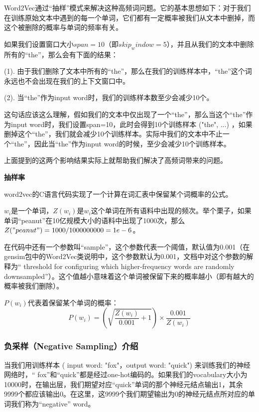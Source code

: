 \documentclass[12pt]{article}
\begin{document}
Word2Vec通过“抽样”模式来解决这种高频词问题。它的基本思想如下：对于我们在训练原始文本中遇到的每一个单词，它们都有一定概率被我们从文本中删掉，而这个被删除的概率与单词的频率有关。

如果我们设置窗口大小$span = 10$（即$skip_window = 5$），并且从我们的文本中删除所有的“the”，那么会有下面的结果：

(1). 由于我们删除了文本中所有的“the”，那么在我们的训练样本中，“the”这个词永远也不会出现在我们的上下文窗口中。

(2). 当“the”作为input word时，我们的训练样本数至少会减少10个。

\begin{framed}
这句话应该这么理解，假如我们的文本中仅出现了一个“the”，那么当这个“the”作为input word时，我们设置span=10，此时会得到10个训练样本 ("the", ...) ，如果删掉这个“the”，我们就会减少10个训练样本。实际中我们的文本中不止一个“the”，因此当“the”作为input word的时候，至少会减少10个训练样本。
\end{framed}

上面提到的这两个影响结果实际上就帮助我们解决了高频词带来的问题。

\textbf{抽样率}

word2vec的C语言代码实现了一个计算在词汇表中保留某个词概率的公式。

$w_i$是一个单词，$Z(w_i)$是$w_i$这个单词在所有语料中出现的频次。举个栗子，如果单词“peanut”在10亿规模大小的语料中出现了1000次，那么$Z("peanut") = 1000 / 1000000000 = 1e-6$。

在代码中还有一个参数叫“sample”，这个参数代表一个阈值，默认值为0.001（在gensim包中的Word2Vec类说明中，这个参数默认为0.001，文档中对这个参数的解释为“ threshold for configuring which higher-frequency words are randomly downsampled”）。这个值越小意味着这个单词被保留下来的概率越小（即有越大的概率被我们删除）。

$P(w_i)$代表着保留某个单词的概率：
$$
P(w_i) = (\sqrt{\frac{Z(w_i)}{0.001} + 1}) \times \frac{0.001}{Z(w_i)}
$$



\subsubsection{负采样（Negative Sampling）介绍}
当我们用训练样本 ( input word: "fox"，output word: "quick") 来训练我们的神经网络时，“ fox”和“quick”都是经过one-hot编码的。如果我们的vocabulary大小为10000时，在输出层，我们期望对应“quick”单词的那个神经元结点输出1，其余9999个都应该输出0。在这里，这9999个我们期望输出为0的神经元结点所对应的单词我们称为“negative” word。
\end{document}
